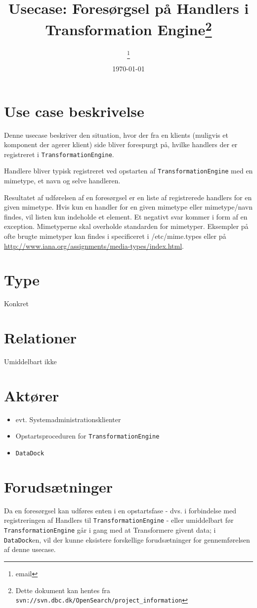 \documentclass{article}
\author{\thanks{email}}
\date{\today}
\title{Usecase: Foresørgsel på Handlers i Transformation Engine\thanks{Dette dokument kan hentes fra \texttt{svn://svn.dbc.dk/OpenSearch/project\_information}}}
\begin{document}
\maketitle

\newpage

\tableofcontents

\section{Use case beskrivelse}

Denne usecase beskriver den situation, hvor der fra en klients
(muligvis et komponent der agerer klient) side bliver forespurgt på,
hvilke handlers der er registreret i \texttt{TransformationEngine}.

Handlere bliver typisk registreret ved opstarten af
\texttt{TransformationEngine} med en mimetype, et navn og selve
handleren.

Resultatet af udførelsen af en foresørgsel er en liste af
registrerede handlers%
for en given mimetype. Hvis kun en handler for en given mimetype eller
mimetype/navn findes, vil listen kun indeholde et element. Et negativt
svar kommer i form af en exception.  Mimetyperne skal overholde
standarden for mimetyper. Eksempler på ofte brugte mimetyper kan
findes i specificeret i /etc/mime.types eller på
\url{http://www.iana.org/assignments/media-types/index.html}.

\section{Type}
Konkret

\section{Relationer}
Umiddelbart ikke

\section{Aktører}
\begin{itemize}
\item evt. Systemadministrationsklienter
\item Opstartsproceduren for \texttt{TransformationEngine}
\item \texttt{DataDock}
\end{itemize}

\section{Forudsætninger}
Da en foresørgsel kan udføres enten i en opstartsfase - dvs. i forbindelse med registreringen af Handlers til \texttt{TransformationEngine} - eller umiddelbart før \texttt{TransformationEngine} går i gang med at Transformere givent data; i \texttt{DataDock}en, vil der kunne eksistere forskellige forudsætninger for gennemførelsen af denne usecase. 
\end{document}
